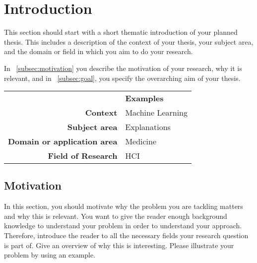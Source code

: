 \section{Introduction}
\label{sec:introduction}
This section should start with a short thematic introduction of your planned thesis. This includes a description of the context of your thesis, your subject area, and the domain or field in which you aim to do your research. 

In ~\autoref{subsec:motivation} you describe the motivation of your research, why it is relevant, and in ~\autoref{subsec:goal}, you specify the overarching aim of your thesis.

\begin{table}[h]
\small
\colorbox{usethiscolorhere}{
\centering
\begin{tabularx}{\textwidth}{@{} r Y @{}}
	&
	\textbf{Examples}\vspace{2mm}\\
    \textbf{Context} & Machine Learning \vspace{2mm}\\
	\textbf{Subject area} &	Explanations \vspace{2mm}\\
    \textbf{Domain or application area} & Medicine \vspace{2mm}\\
    \textbf{Field of Research} & HCI \vspace{2mm}\\
\end{tabularx}
}
\end{table}

\subsection{Motivation}
\label{subsec:motivation}
In this section, you should motivate why the problem you are tackling matters and why this is relevant. You want to give the reader enough background knowledge to understand your problem in order to understand your approach. Therefore, introduce the reader to all the necessary fields your research question is part of. Give an overview of why this is interesting. Please illustrate your problem by using an example.


